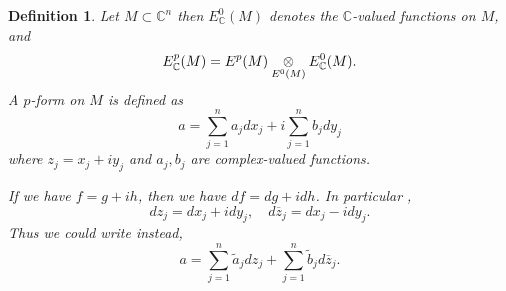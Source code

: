\documentclass{article}
\newtheorem{definition}{Definition}[section]
\newcommand{\C}[0]{\mathbb{C}}
\newcommand{\tens}[1]{%
  \mathbin{\mathop{\otimes}\displaylimits_{#1}}%
}
\begin{document}
\begin{definition}
  Let $M\subset\C^n$ then $E^0_\C(M)$ denotes the $\C$-valued functions on $M$, and 
  \begin{equation*}
    E_\C^p(M) = E^p(M)\tens{E^0(M)}E^0_\C(M).
  \end{equation*}
  A $p$-form on $M$ is defined as 
  \begin{equation*}
    a = \sum_{j=1}^n a_jd{x_j} + i\sum_{j=1}^n b_jd{y_j}
  \end{equation*}
  where $z_j = x_j+iy_j$ and $a_j,b_j$ are complex-valued functions. 
  \par If we have $f=g+ih$, then we have $df=dg+idh$. In particular ,
  \begin{equation*}
    dz_j = dx_j+idy_j,\quad d\overline{z}_j = dx_j - idy_j.
  \end{equation*}
  Thus we could write instead, 
  \begin{equation*}
    a = \sum_{j=1}^n \tilde{a}_jdz_j+\sum_{j=1}^n \tilde{b}_jd\overline{z}_j.
  \end{equation*}
\end{definition}
\end{document}
